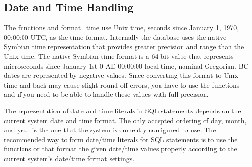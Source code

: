\subsection{Date and Time Handling}
\label{subsec:mylabel15}
The functions  and \textsf{format_time} use Unix time, 
seconds since January 1, 1970, 00:00:00 UTC, as the time format. Internally 
the database uses the native Symbian time representation that provides 
greater precision and range than the Unix time. The native Symbian time 
format is a 64-bit value that represents microseconds since January 1st 0 AD 
00:00:00 local time, nominal Gregorian. BC dates are represented by negative 
values. Since converting this format to Unix time and back may cause slight 
round-off errors, you have to use the functions  and 
 if you need to be able to handle these values 
with full precision.

The representation of date and time literals in SQL statements depends
on the current system date and time format. The only accepted ordering
of day, month, and year is the one that the system is currently
configured to use. The recommended way to form date/time literals for
SQL statements is to use the functions  or
 that format the given date/time values
properly according to the current system's date/time format settings.
